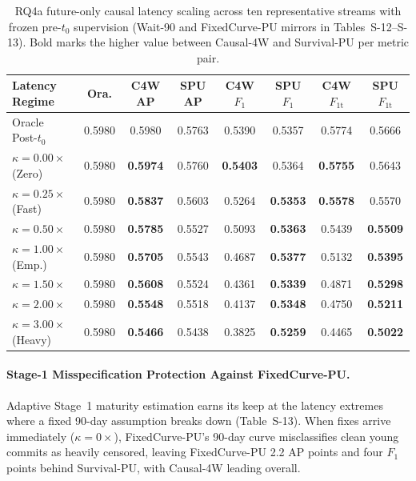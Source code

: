\documentclass[pdflatex,sn-basic]{sn-jnl}
\theoremstyle{definition}
\theoremstyle{plain}
\begin{document}
\begin{table}[t]
\centering
\caption{RQ4a future-only causal latency scaling across ten representative streams with frozen pre-$t_0$ supervision (Wait-90 and FixedCurve-PU mirrors in Tables~S-12--S-13). Bold marks the higher value between Causal-4W and Survival-PU per metric pair.}
\label{tab:rq4a_kappa}
\fontsize{7.5}{9.0}\selectfont
\setlength{\tabcolsep}{1.2pt}
\begin{tabular*}{\textwidth}{@{\extracolsep\fill}lccccccc@{}}
\toprule
\textbf{Latency Regime} & \textbf{Ora.} & \textbf{C4W AP} & \textbf{SPU AP} & \textbf{C4W $F_1$} & \textbf{SPU $F_1$} & \textbf{C4W $F_{1\mathrm{t}}$} & \textbf{SPU $F_{1\mathrm{t}}$} \\
\midrule
Oracle Post-$t_0$ & 0.5980 & 0.5980 & 0.5763 & 0.5390 & 0.5357 & 0.5774 & 0.5666 \\
\midrule
$\kappa=0.00\times$ (Zero) & 0.5980 & \textbf{0.5974} & 0.5760 & \textbf{0.5403} & 0.5364 & \textbf{0.5755} & 0.5643 \\
$\kappa=0.25\times$ (Fast) & 0.5980 & \textbf{0.5837} & 0.5603 & 0.5264 & \textbf{0.5353} & \textbf{0.5578} & 0.5570 \\
$\kappa=0.50\times$ & 0.5980 & \textbf{0.5785} & 0.5527 & 0.5093 & \textbf{0.5363} & 0.5439 & \textbf{0.5509} \\
$\kappa=1.00\times$ (Emp.) & 0.5980 & \textbf{0.5705} & 0.5543 & 0.4687 & \textbf{0.5377} & 0.5132 & \textbf{0.5395} \\
$\kappa=1.50\times$ & 0.5980 & \textbf{0.5608} & 0.5524 & 0.4361 & \textbf{0.5339} & 0.4871 & \textbf{0.5298} \\
$\kappa=2.00\times$ & 0.5980 & \textbf{0.5548} & 0.5518 & 0.4137 & \textbf{0.5348} & 0.4750 & \textbf{0.5211} \\
$\kappa=3.00\times$ (Heavy) & 0.5980 & \textbf{0.5466} & 0.5438 & 0.3825 & \textbf{0.5259} & 0.4465 & \textbf{0.5022} \\
\bottomrule
\end{tabular*}
\vspace{2pt}\par{}
\end{table}

\paragraph{Stage-1 Misspecification Protection Against FixedCurve-PU.}
Adaptive Stage~1 maturity estimation earns its keep at the latency extremes where a fixed 90-day assumption breaks down (Table~S-13). When fixes arrive immediately ($\kappa = 0\times$), FixedCurve-PU's 90-day curve misclassifies clean young commits as heavily censored, leaving FixedCurve-PU 2.2 AP points and four $F_1$ points behind Survival-PU, with Causal-4W leading overall.
\end{document}
